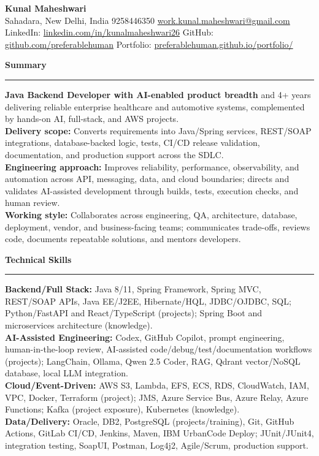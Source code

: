 \documentclass[11pt,letterpaper]{article}
\newcommand{\ressection}[1]{\Needspace{6\baselineskip}\vspace{8pt}\par\textbf{#1}\par\vspace{2pt}\hrule\vspace{5pt}}
\begin{document}
\pagestyle{empty}\raggedright\fontsize{11}{12.5}\selectfont

{\Large \textbf{Kunal Maheshwari}}\\
Sahadara, New Delhi, India \textbar{} 9258446350 \textbar{} \href{mailto:work.kunal.maheshwari@gmail.com}{work.kunal.maheshwari@gmail.com}\\
LinkedIn: \href{https://www.linkedin.com/in/kunalmaheshwari26}{linkedin.com/in/kunalmaheshwari26} \textbar{} GitHub: \href{https://github.com/preferablehuman}{github.com/preferablehuman} \textbar{} Portfolio: \href{https://preferablehuman.github.io/portfolio/}{preferablehuman.github.io/portfolio/}

\ressection{Summary}
\textbf{Java Backend Developer with AI-enabled product breadth} and 4+ years delivering reliable enterprise healthcare and automotive systems, complemented by hands-on AI, full-stack, and AWS projects.\\[2pt]
\textbf{Delivery scope:} Converts requirements into Java/Spring services, REST/SOAP integrations, database-backed logic, tests, CI/CD release validation, documentation, and production support across the SDLC.\\[2pt]
\textbf{Engineering approach:} Improves reliability, performance, observability, and automation across API, messaging, data, and cloud boundaries; directs and validates AI-assisted development through builds, tests, execution checks, and human review.\\[2pt]
\textbf{Working style:} Collaborates across engineering, QA, architecture, database, deployment, vendor, and business-facing teams; communicates trade-offs, reviews code, documents repeatable solutions, and mentors developers.

\ressection{Technical Skills}
\textbf{Backend/Full Stack:} Java 8/11, Spring Framework, Spring MVC, REST/SOAP APIs, Java EE/J2EE, Hibernate/HQL, JDBC/OJDBC, SQL; Python/FastAPI and React/TypeScript (projects); Spring Boot and microservices architecture (knowledge).\\
\textbf{AI-Assisted Engineering:} Codex, GitHub Copilot, prompt engineering, human-in-the-loop review, AI-assisted code/debug/test/documentation workflows (projects); LangChain, Ollama, Qwen 2.5 Coder, RAG, Qdrant vector/NoSQL database, local LLM integration.\\
\textbf{Cloud/Event-Driven:} AWS S3, Lambda, EFS, ECS, RDS, CloudWatch, IAM, VPC, Docker, Terraform (project); JMS, Azure Service Bus, Azure Relay, Azure Functions; Kafka (project exposure), Kubernetes (knowledge).\\
\textbf{Data/Delivery:} Oracle, DB2, PostgreSQL (projects/training), Git, GitHub Actions, GitLab CI/CD, Jenkins, Maven, IBM UrbanCode Deploy; JUnit/JUnit4, integration testing, SoapUI, Postman, Log4j2, Agile/Scrum, production support.
\end{document}
